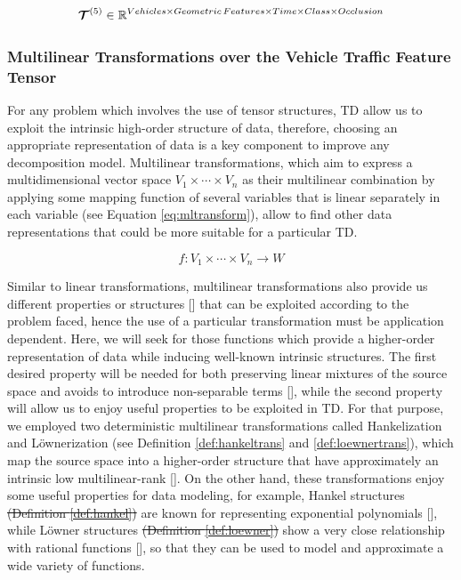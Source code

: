 \documentclass[sensors,article,submit,moreauthors,pdftex]{Definitions/mdpi}
\newcommand{\mathten}[1]{\boldsymbol{\mathbf{\mathcal{\MakeUppercase{#1}}}}}
\providecommand{\DIFadd}[1]{{\protect\color{blue}\uwave{#1}}} %
\providecommand{\DIFdel}[1]{{\protect\color{red}\sout{#1}}}                      %
\providecommand{\DIFaddbegin}{} %
\providecommand{\DIFaddend}{} %
\providecommand{\DIFdelbegin}{} %
\providecommand{\DIFdelend}{} %
\begin{document}
\begin{equation}
\mathten{T}^{(5)} \in \mathbb{R}^{Vehicles \times Geometric\,Features \times Time \times Class \times Occlusion}
\label{eq:vtf5model}
\end{equation}

\subsubsection{Multilinear Transformations over the Vehicle Traffic Feature Tensor}
For any problem which involves the use of tensor structures, TD allow us to  exploit the intrinsic high-order structure of data, therefore, choosing an appropriate representation of data is a key component to improve any decomposition model. Multilinear transformations, which aim to express a multidimensional vector space $V_1 \times \cdots \times V_n$ as their multilinear combination by applying some mapping function of several variables that is linear separately in each variable (see Equation \ref{eq:mltransform}), allow to find other data representations that could be more suitable for a particular TD.


\begin{equation}
f : V_1 \times \cdots \times V_n \rightarrow W
\label{eq:mltransform}
\end{equation}

Similar to linear transformations, multilinear transformations also provide us different properties or structures [] that can be exploited according to the problem faced, hence the use of a particular transformation must be application dependent. Here, we will seek for those functions which provide a higher-order representation of data while inducing well-known intrinsic structures. The first desired property will be needed for both preserving linear mixtures of the source space and avoids to introduce non-separable terms [], while the second property will allow us to enjoy useful properties to be exploited in TD. For that purpose, we employed two deterministic multilinear transformations called Hankelization and L{\"o}wnerization (see Definition \ref{def:hankeltrans} and \ref{def:loewnertrans}), which map the source space into a higher-order structure that have approximately an intrinsic low multilinear-rank \DIFaddbegin [\DIFadd{x}]\DIFaddend . On the other hand, these transformations enjoy some useful properties for data modeling, for example, Hankel structures \DIFdelbegin \DIFdel{(Definition \ref{def:hankel}) }\DIFdelend are known for representing exponential polynomials [], while L{\"o}wner structures \DIFdelbegin \DIFdel{(Definition \ref{def:loewner}) }\DIFdelend show a very close relationship with rational functions [], so that they can be used to model and approximate a wide variety of functions.
\end{document}
